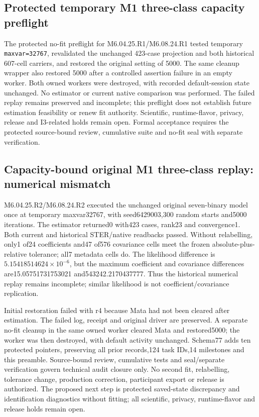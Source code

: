 \documentclass[11pt,a4paper]{article}
\begin{document}
\subsection*{Protected temporary M1 three-class capacity preflight}
The protected no-fit preflight for M6.04.25.R1/M6.08.24.R1 tested temporary \texttt{maxvar=32767}, revalidated the unchanged 423-case projection and both historical 607-cell carriers, and restored the original setting of 5000. The same cleanup wrapper also restored 5000 after a controlled assertion failure in an empty worker. Both owned workers were destroyed, with recorded default-session state unchanged. No estimator or current native comparison was performed. The failed replay remains preserved and incomplete; this preflight does not establish future estimation feasibility or renew fit authority. Scientific, runtime-flavor, privacy, release and I3-related holds remain open. Formal acceptance requires the protected source-bound review, cumulative suite and no-fit seal with separate verification.

\subsection*{Capacity-bound original M1 three-class replay: numerical mismatch}
M6.04.25.R2/M6.08.24.R2 executed the unchanged original seven-binary model once at temporary maxvar32767, with seed6429003,300 random starts and5000 iterations. The estimator returned0 with423 cases, rank23 and convergence1. Both current and historical STER/native readbacks passed. Without relabelling, only1 of24 coefficients and47 of576 covariance cells meet the frozen absolute-plus-relative tolerance; all7 metadata cells do. The likelihood difference is $5.15418514624\times10^{-6}$, but the maximum coefficient and covariance differences are15.05751731753021 and543242.2170437777. Thus the historical numerical replay remains incomplete; similar likelihood is not coefficient/covariance replication.

Initial restoration failed with r4 because Mata had not been cleared after estimation. The failed log, receipt and original driver are preserved. A separate no-fit cleanup in the same owned worker cleared Mata and restored5000; the worker was then destroyed, with default activity unchanged. Schema77 adds ten protected pointers, preserving all prior records,124 task IDs,14 milestones and this preamble. Source-bound review, cumulative tests and seal/separate verification govern technical audit closure only. No second fit, relabelling, tolerance change, production correction, participant export or release is authorized. The proposed next step is protected saved-state discrepancy and identification diagnostics without fitting; all scientific, privacy, runtime-flavor and release holds remain open.
\end{document}
